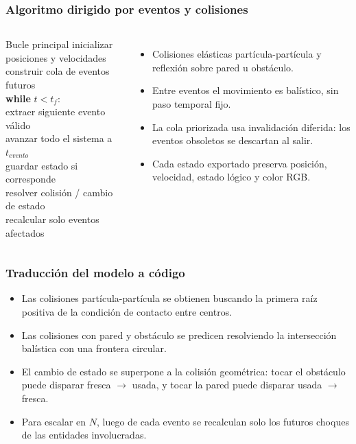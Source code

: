 \documentclass{beamer}
\begin{document}
\begin{frame}
  \frametitle{Algoritmo dirigido por eventos y colisiones}
  \small
  \begin{columns}[T,onlytextwidth]
    \begin{block}{Bucle principal}
      \ttfamily\tiny
      inicializar posiciones y velocidades\\
      construir cola de eventos futuros\\
      \textbf{while} $t < t_f$:\\
      \hspace*{1em}extraer siguiente evento v\'alido\\
      \hspace*{1em}avanzar todo el sistema a $t_{evento}$\\
      \hspace*{1em}guardar estado si corresponde\\
      \hspace*{1em}resolver colisi\'on / cambio de estado\\
      \hspace*{1em}recalcular solo eventos afectados
    \end{block}

    \begin{itemize}
      \item Colisiones el\'asticas part\'icula-part\'icula y reflexi\'on sobre pared u obst\'aculo.
      \item Entre eventos el movimiento es bal\'istico, sin paso temporal fijo.
      \item La cola priorizada usa invalidaci\'on diferida: los eventos obsoletos se descartan al salir.
      \item Cada estado exportado preserva posici\'on, velocidad, estado l\'ogico y color RGB.
    \end{itemize}
  \end{columns}
\end{frame}

\begin{frame}
  \frametitle{Traducci\'on del modelo a c\'odigo}
  \begin{itemize}
    \item Las colisiones part\'icula-part\'icula se obtienen buscando la primera ra\'iz positiva de la condici\'on de contacto entre centros.
    \item Las colisiones con pared y obst\'aculo se predicen resolviendo la intersecci\'on bal\'istica con una frontera circular.
    \item El cambio de estado se superpone a la colisi\'on geom\'etrica: tocar el obst\'aculo puede disparar fresca $\rightarrow$ usada, y tocar la pared puede disparar usada $\rightarrow$ fresca.
    \item Para escalar en $N$, luego de cada evento se recalculan solo los futuros choques de las entidades involucradas.
  \end{itemize}
\end{frame}
\end{document}
